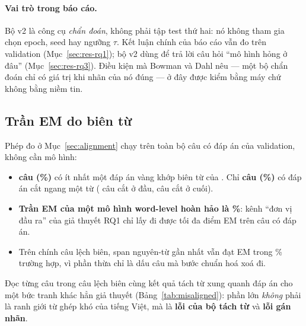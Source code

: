 \paragraph{Vai trò trong báo cáo.} Bộ v2 là công cụ \emph{chẩn đoán}, không phải tập test thứ hai:
nó không tham gia chọn epoch, seed hay ngưỡng $\tau$. Kết luận chính của báo cáo vẫn đo trên
validation (Mục~\ref{sec:res-rq1}); bộ v2 dùng để trả lời câu hỏi ``mô hình hỏng ở đâu''
(Mục~\ref{sec:res-rq3}). Điều kiện mà Bowman và Dahl \cite{bowman2021fix} nêu --- một bộ chẩn
đoán chỉ có giá trị khi nhãn của nó đúng --- ở đây được kiểm bằng máy chứ không bằng niềm tin.

\subsection{Trần EM do biên từ}
\label{sec:alignment-res}

Phép đo ở Mục~\ref{sec:alignment} chạy trên toàn bộ \SegN{} câu có đáp án của validation, không cần
mô hình:

\begin{itemize}
  \item \textbf{\SegAligned{} câu (\SegAlignedPct\%)} có ít nhất một đáp án vàng khớp biên từ của
        . Chỉ \textbf{\SegMis{} câu (\SegMisPct\%)} có đáp án cắt ngang một từ (\SegStartCut{}
        câu cắt ở đầu, \SegEndCut{} câu cắt ở cuối).
  \item \textbf{Trần EM của một mô hình word-level hoàn hảo là \SegOracle\%}: kênh ``đơn vị đầu ra''
        của giả thuyết RQ1 chỉ lấy đi được tối đa \SegCeilingLoss{} điểm EM trên câu có đáp án.
  \item Trên chính \SegMis{} câu lệch biên, span nguyên-từ gần nhất vẫn đạt EM trong \SegOracleMis\%
        trường hợp, vì phần thừa chỉ là dấu câu mà bước chuẩn hoá xoá đi.
\end{itemize}

Đọc từng câu trong \SegMis{} câu lệch biên cùng kết quả tách từ xung quanh đáp án cho một bức tranh
khác hẳn giả thuyết (Bảng~\ref{tab:misaligned}): phần lớn \emph{không} phải là ranh giới từ ghép
khó của tiếng Việt, mà là \textbf{lỗi của bộ tách từ} và \textbf{lỗi gán nhãn}.


